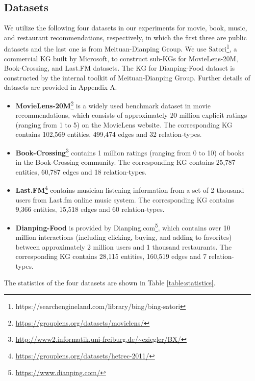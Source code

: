 \documentclass[sigconf]{acmart}
\begin{document}
	\subsection{Datasets}
		We utilize the following four datasets in our experiments for movie, book, music, and restaurant recommendations, respectively, in which the first three are public datasets and the last one is from Meituan-Dianping Group.
		We use Satori\footnote{https://searchengineland.com/library/bing/bing-satori}, a commercial KG built by Microsoft, to construct sub-KGs for MovieLens-20M, Book-Crossing, and Last.FM datasets.
		The KG for Dianping-Food dataset is constructed by the internal toolkit of Meituan-Dianping Group.
		Further details of datasets are provided in Appendix A.
		\begin{itemize}
			\item \textbf{MovieLens-20M}\footnote{\url{https://grouplens.org/datasets/movielens/}} is a widely used benchmark dataset in movie recommendations, which consists of approximately 20 million explicit ratings (ranging from 1 to 5) on the MovieLens website. The corresponding KG contains 102,569 entities, 499,474 edges and 32 relation-types.
			\item \textbf{Book-Crossing}\footnote{\url{http://www2.informatik.uni-freiburg.de/~cziegler/BX/}} contains 1 million ratings (ranging from 0 to 10) of books in the Book-Crossing community.  The corresponding KG contains 25,787 entities, 60,787 edges and 18 relation-types.
			\item \textbf{Last.FM}\footnote{\url{https://grouplens.org/datasets/hetrec-2011/}} contains musician listening information from a set of 2 thousand users from Last.fm online music system.  The corresponding KG contains 9,366 entities, 15,518 edges and 60 relation-types.
			\item \textbf{Dianping-Food} is provided by Dianping.com\footnote{\url{https://www.dianping.com/}}, which contains over 10 million interactions (including clicking, buying, and adding to favorites) between approximately 2 million users and 1 thousand restaurants. The corresponding KG contains 28,115 entities, 160,519 edges and 7 relation-types.
		\end{itemize}
		
		The statistics of the four datasets are shown in Table \ref{table:statistics}.
		
\end{document}
